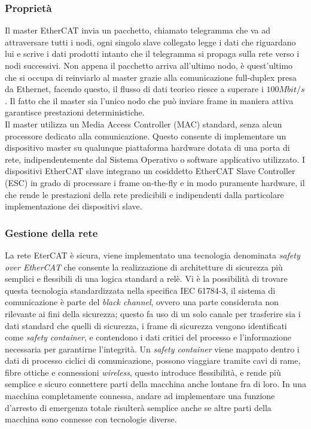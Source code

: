 \subsubsection{Proprietà}
Il master EtherCAT invia un pacchetto, chiamato telegramma che va ad attraversare tutti i nodi, ogni singolo slave collegato legge i dati che riguardano lui e scrive i dati prodotti intanto che il telegramma si propaga sulla rete verso i nodi successivi. Non appena il pacchetto arriva all'ultimo nodo, è quest'ultimo che si occupa di reinviarlo al master grazie alla comunicazione full-duplex presa da Ethernet, facendo questo, il flusso di dati teorico riesce a superare i $100 Mbit/s$. Il fatto che il master sia l'unico nodo che può inviare frame in maniera attiva garantisce prestazioni deterministiche.\\ Il master utilizza un Media Access Controller (MAC) standard, senza alcun processore dedicato alla comunicazione. Questo consente di implementare un dispositivo master su qualunque piattaforma hardware dotata di una porta di rete, indipendentemente dal Sistema Operativo o software applicativo utilizzato. I dispositivi EtherCAT slave integrano un cosiddetto EtherCAT Slave Controller (ESC) in grado di processare i frame on-the-fly e in modo puramente hardware, il che rende le prestazioni della rete predicibili e indipendenti dalla particolare implementazione dei dispositivi slave.
\subsubsection{Gestione della rete}
La rete EterCAT è sicura, viene implementato una tecnologia denominata \textit{safety over EtherCAT} che consente la realizzazione di architetture di sicurezza più semplici e flessibili di una logica standard a relè. Vi è la possibilità di trovare questa tecnologia standardizzata nella specifica IEC 61784-3, il sistema di comunicazione è parte del \textit{black channel}, ovvero una parte considerata non rilevante ai fini della sicurezza; questo fa uso di un solo canale per trasferire sia i dati standard che quelli di sicurezza, i frame di sicurezza vengono identificati come \textit{safety container}, e contendono i dati critici del processo e l'informazione necessaria per garantirne l'integrità. Un \textit{safety container} viene mappato dentro i dati di processo ciclici di comunicazione, possono viaggiare tramite cavi di rame, fibre ottiche e connessioni \textit{wireless}, questo introduce flessibilità, e rende più semplice e sicuro connettere parti della macchina anche lontane fra di loro. In una macchina completamente connessa, andare ad implementare una funzione d'arresto di emergenza totale risulterà semplice anche se altre parti della macchina sono connesse con tecnologie diverse. 
